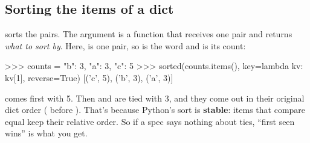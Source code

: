 \documentclass[10pt,a4paper]{article}
\begin{document}
\subsection{Sorting the items of a dict}
 sorts the  pairs. The  argument is a function that receives one pair and returns \emph{what to sort by}. Here,  is one pair, so  is the word and  is its count:
\begin{txtcode}
>>> counts = {"b": 3, "a": 3, "c": 5}
>>> sorted(counts.items(), key=lambda kv: kv[1], reverse=True)
[('c', 5), ('b', 3), ('a', 3)]
\end{txtcode}
 comes first with 5. Then  and  are tied with 3, and they come out in their original dict order ( before ). That’s because Python’s sort is \textbf{stable}: items that compare equal keep their relative order. So if a spec says nothing about ties, “first seen wins” is what you get.
\end{document}
